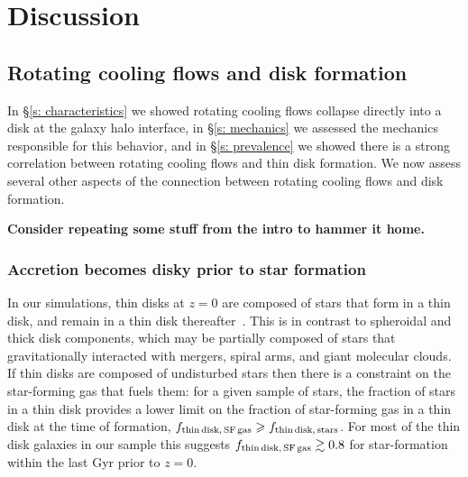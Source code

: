 \documentclass[fleqn,usenatbib]{mnras}
\begin{document}
\section{Discussion}
\label{s: discussion}



\subsection{Rotating cooling flows and disk formation}
\label{s: disk formation}

In \S\ref{s: characteristics} we showed rotating cooling flows collapse directly into a disk at the galaxy halo interface, in \S\ref{s: mechanics} we assessed the mechanics responsible for this behavior, and in \S\ref{s: prevalence} we showed there is a strong correlation between rotating cooling flows and thin disk formation.
We now assess several other aspects of the connection between rotating cooling flows and disk formation.


\textbf{
Consider repeating some stuff from the intro to hammer it home.
}

\subsubsection{Accretion becomes disky prior to star formation}
\label{s: disk formation -- condition}

In our simulations, thin disks at $z=0$ are composed of stars that form in a thin disk, and remain in a thin disk thereafter~\citep{Yu2021}.
This is in contrast to spheroidal and thick disk components, which may be partially composed of stars that gravitationally interacted with mergers, spiral arms, and giant molecular clouds.
If thin disks are composed of undisturbed stars then there is a  constraint on the star-forming gas that fuels them:
for a given sample of stars, the fraction of stars in a thin disk provides a lower limit on the fraction of star-forming gas in a thin disk at the time of formation, $f_{\rm thin\,disk,\,SF\,gas} \ge f_{\rm thin\,disk,\,stars}$.
For most of the thin disk galaxies in our sample this suggests $f_{\rm thin\,disk,\,SF\,gas} \gtrsim 0.8$ for star-formation within the last Gyr prior to $z=0$.
\end{document}
